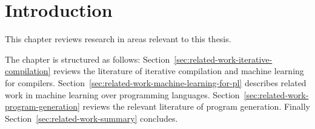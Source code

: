 \section{Introduction}

This chapter reviews research in areas relevant to this thesis.

The chapter is structured as follows: Section~\ref{sec:related-work-iterative-compilation} reviews the literature of iterative compilation and machine learning for compilers. Section~\ref{sec:related-work-machine-learning-for-pl} describes related work in machine learning over programming languages. Section~\ref{sec:related-work-program-generation} reviews the relevant literature of program generation. Finally Section~\ref{sec:related-work-summary} concludes.